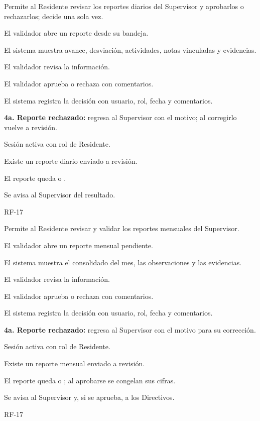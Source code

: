 {Permite al Residente revisar los reportes diarios del Supervisor y aprobarlos o rechazarlos; decide una sola vez.}
{\item El validador abre un reporte  desde su bandeja.
 \item El sistema muestra avance, desviación, actividades, notas vinculadas y evidencias.
 \item El validador revisa la información.
 \item El validador aprueba o rechaza con comentarios.
 \item El sistema registra la decisión con usuario, rol, fecha y comentarios.}
{\item \textbf{4a. Reporte rechazado:} regresa al Supervisor con el motivo; al corregirlo vuelve a revisión.}
{\item Sesión activa con rol de Residente.
 \item Existe un reporte diario enviado a revisión.}
{\item El reporte queda  o .
 \item Se avisa al Supervisor del resultado.}
{RF-17}

{Permite al Residente revisar y validar los reportes mensuales del Supervisor.}
{\item El validador abre un reporte mensual pendiente.
 \item El sistema muestra el consolidado del mes, las observaciones y las evidencias.
 \item El validador revisa la información.
 \item El validador aprueba o rechaza con comentarios.
 \item El sistema registra la decisión con usuario, rol, fecha y comentarios.}
{\item \textbf{4a. Reporte rechazado:} regresa al Supervisor con el motivo para su corrección.}
{\item Sesión activa con rol de Residente.
 \item Existe un reporte mensual enviado a revisión.}
{\item El reporte queda  o ; al aprobarse se congelan sus cifras.
 \item Se avisa al Supervisor y, si se aprueba, a los Directivos.}
{RF-17}

